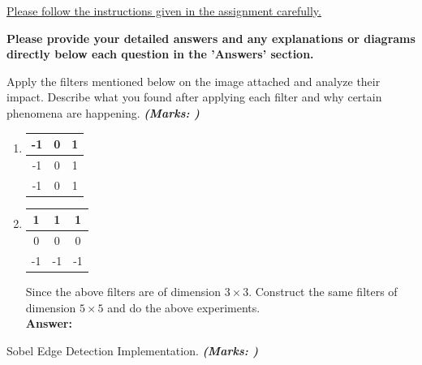 \documentclass[12pt, a4paper]{exam}
\begin{document}
\uline{Please follow the instructions given in the assignment carefully.}
\par 
\vspace{0.15in}
\noindent
\centering
{\small \bfseries  Please provide your detailed answers and any explanations or diagrams directly below each question in the 'Answers' section. }
\vspace{0.2in}
\begin{questions}
	\pointsdroppedatright
	\question
 Apply the filters mentioned below on the image attached and analyze their impact. Describe what you found after applying each filter
and why certain phenomena are happening. \textbf{\textit{(Marks: )}}\\
\begin{enumerate}
    

\item \begin{center}
\begin{tabular}{|c|c|c|}
\hline
-1 & 0 & 1 \\ \hline
-1 & 0 & 1\\ \hline
-1 & 0 & 1 \\ \hline
\end{tabular}
\end{center}

 \item \begin{center}
\begin{tabular}{|c|c|c|}
\hline
1 & 1 & 1 \\ \hline
0 & 0 & 0 \\ \hline
-1 & -1 & -1 \\ \hline
\end{tabular}
\end{center}
	Since the above filters are of dimension $3 \times 3$. Construct the same filters of dimension $5 \times 5$ and do the above experiments.
  \vspace{0.2in}
	\pointsdroppedatright\\
\textbf{Answer:}

\end{enumerate}



 \vspace{0.2in}
	\question
 Sobel Edge Detection Implementation. \textbf{\textit{(Marks: )}}
	\begin{parts}

\end{parts}
\end{questions}
\end{document}
